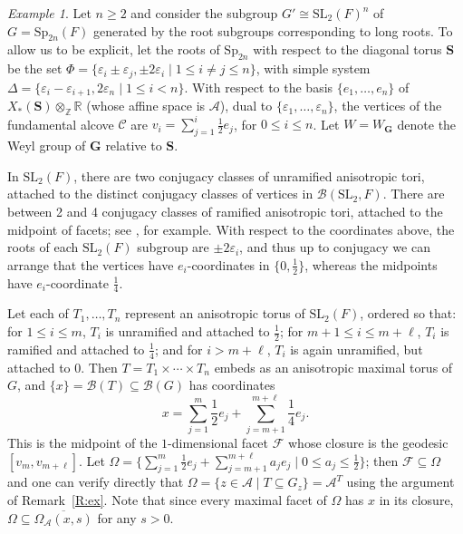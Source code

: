 \documentclass[12pt]{amsart}
\newcommand{\ratk}{F}
\newcommand{\SL}{\mathrm{SL}}
\newcommand{\Sp}{\mathrm{Sp}}
\newcommand{\GG}{\mathbf{G}} %
\newcommand{\Stor}{\mathbf{S}} %
\newcommand{\apart}{{\mathcal{A}}}
\newcommand{\Aset}{\Omega_{\apart}}
\newcommand{\buil}{\mathcal{B}}
\newcommand{\C}{\mathcal{C}} %
\newcommand{\F}{\mathcal{F}} %
\newcommand{\ep}{\varepsilon}
\theoremstyle{plain}
\theoremstyle{definition}
\theoremstyle{remark}
\newtheorem{egr}[theorem]{Example}
\newenvironment{example}{\begin{egr}}{\qedsymbol \end{egr}}
\numberwithin{equation}{section}
\numberwithin{figure}{section}
\begin{document}
\begin{example} \label{Ex:2}  Let $n\geq 2$ and consider the subgroup $G' \cong \SL_2(\ratk)^n$ of $G=\Sp_{2n}(\ratk)$ generated by the root subgroups corresponding to long roots.  To allow us to be explicit, let the roots of $\Sp_{2n}$ with respect to the diagonal torus $\Stor$ be the set $\Phi=\{\ep_i\pm \ep_j, \pm2\ep_i \mid 1\leq i \neq j \leq n\}$, with simple system $\Delta=\{\ep_i-\ep_{i+1}, 2\ep_n\mid 1\leq i < n\}$.   With respect to the basis $\{e_1,\ldots, e_n\}$ of $X_*(\Stor)\otimes_{\mathbb{Z}}\mathbb{R}$ (whose affine space is $\apart$), dual to $\{\ep_1, \ldots, \ep_n\}$,  the vertices of the fundamental alcove $\C$ are $v_i = \sum_{j=1}^i \frac12e_j$, for $0\leq i \leq n$.  Let $W=W_{\GG}$ denote the Weyl group of $\GG$ relative to $\Stor$.


In $\SL_2(\ratk)$, there are two conjugacy classes of unramified anisotropic tori, attached to the distinct conjugacy classes of vertices in $\buil(\SL_2,\ratk)$.  There are between 2 and 4 conjugacy classes of ramified anisotropic tori, attached to the midpoint of facets; see \cite{Nevins2013}, for example.  With respect to the coordinates above, the roots of each $\SL_2(\ratk)$ subgroup are $\pm 2\ep_i$, and thus up to conjugacy we can arrange that the vertices have $e_i$-coordinates in $\{0,\frac12\}$, whereas the midpoints have $e_i$-coordinate $\frac14$.

Let each of $T_1,\ldots, T_n$ represent an anisotropic torus of $\SL_2(\ratk)$, ordered so that: for $1\leq i\leq m$, $T_i$ is unramified and attached to $\frac12$; for $m+1\leq i \leq m+\ell$, $T_i$ is ramified and attached to $\frac14$; and for $i>m+\ell$, $T_i$ is again  unramified, but attached to $0$.  Then $T=T_1\times \cdots \times T_n$ embeds as an anisotropic maximal  torus of $G$, and $\{x\} = \buil(T)\subseteq \buil(G)$ has coordinates
$$
x = \sum_{j=1}^m \frac12e_j + \sum_{j=m+1}^{m+\ell} \frac14e_j.
$$
This is the midpoint of the $1$-dimensional facet $\F$ whose closure is the geodesic $[v_m, v_{m+\ell}]$.  Let $\Omega = \{\sum_{j=1}^m \frac12e_j +  \sum_{j=m+1}^{m+\ell} a_je_j \mid 0\leq a_j \leq \frac12\}$; then $\F \subseteq \Omega$ and one can verify directly that $\Omega = \{z \in \apart \mid T\subseteq G_z\}=\apart^T$ using the argument of Remark~\ref{R:ex}.  Note that since every maximal facet of $\Omega$ has $x$ in its closure,  $\Omega \subseteq \overline{\Aset(x,s)}$ for any $s>0$.


\end{example}
\end{document}
